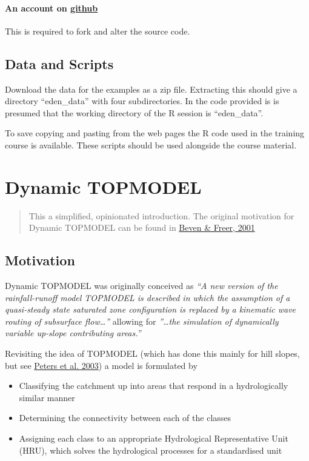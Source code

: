 \documentclass[]{article}
\begin{document}
\paragraph{An account on \href{https://github.com/}{github}}

This is required to fork and alter the source code.

\subsection{Data and Scripts}

{Download} the data for the examples as a zip
file. Extracting this should give a directory ``eden\_data'' with four
subdirectories. In the code provided is is presumed that the working directory
of the R session is ``eden\_data''.

To save copying and pasting from the web pages the R code used in the
training course is {available}. These scripts
should be used alongside the course material.

\section{Dynamic TOPMODEL}

\begin{quote}
This a simplified, opinionated introduction. The original motivation for
Dynamic TOPMODEL can be found in  \href{https://doi.org/10.1002/hyp.252}{Beven \& Freer,
2001}

\end{quote}

\subsection{Motivation}

Dynamic TOPMODEL was originally conceived as \emph{``A new version of the rainfall-runoff model TOPMODEL
is described in which the assumption of a quasi-steady state saturated zone
configuration is replaced by a kinematic wave routing of subsurface flow\ldots{}''}
allowing for \emph{''\ldots{}the simulation of dynamically variable up-slope contributing
areas.''}

Revisiting the idea of TOPMODEL (which has done this mainly for hill slopes, but
see \href{https://doi.org/10.1002/hyp.1128}{Peters et al. 2003}) a
model is formulated by

\begin{itemize}
\item Classifying the catchment up into areas that respond in a hydrologically
similar manner

\item Determining the connectivity between each of the classes

\item Assigning each class to an appropriate Hydrological Representative Unit
(HRU), which solves the hydrological processes for a standardised unit

\end{itemize}
\end{document}
